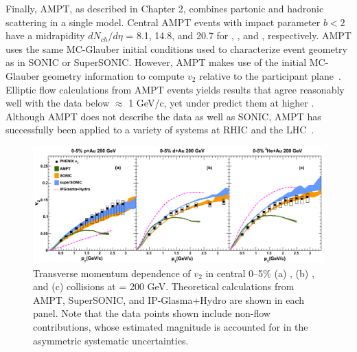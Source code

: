 Finally, AMPT, as described in Chapter 2, combines partonic and hadronic scattering in a single model. Central AMPT events with impact parameter $b<2$ have a midrapidity $dN_{ch}/d\eta$ = 8.1, 14.8, and 20.7 for \pau, \dau, and \hau, respectively. AMPT uses the same MC-Glauber initial conditions used to characterize event geometry as in SONIC or SuperSONIC. However, AMPT makes use of the initial MC-Glauber geometry information to compute $v_2$ relative to the participant plane~\cite{PhysRevC.92.054903}. Elliptic flow calculations from AMPT events yields results that agree reasonably well with the data below \pt $\approx$ 1 GeV/c, yet under predict them at higher \pt. Although AMPT does not describe the data as well as SONIC, AMPT has successfully been applied to a variety of systems at RHIC and the LHC~\cite{PhysRevC.93.054911}. 

\begin{figure}[!ht]
\begin{center}
\includegraphics[width=1.0\linewidth]{figs/indepth_theory_comparison.png}
\caption{Transverse momentum dependence of $v_2$ in central 0--5\% (a) \pau, (b) \dau, and (c) \hau collisions at \sqsn = 200 GeV. Theoretical calculations from AMPT, SuperSONIC, and IP-Glasma+Hydro are shown in each panel. Note that the data points shown include non-flow contributions, whose estimated magnitude is accounted for in the asymmetric systematic uncertainties.}
\label{fig:indepth_comp_three}
\end{center}
\end{figure}

